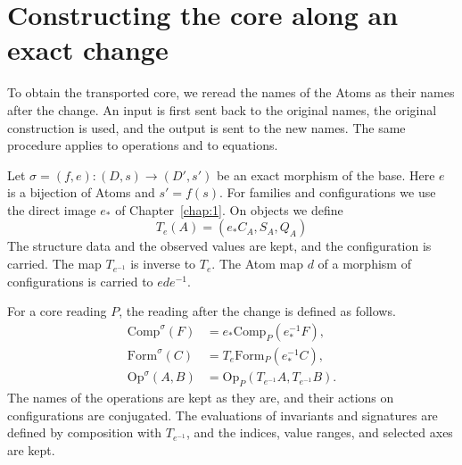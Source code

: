 \section{Constructing the core along an exact change}\label{sec:4.2}

To obtain the transported core, we reread the names of the Atoms as their names after the
change. An input is first sent back to the original names, the original construction is
used, and the output is sent to the new names. The same procedure applies to operations and
to equations.

\begin{construction}\label{cons:4.3}

Let $\sigma=(f,e):(D,s)\to(D',s')$ be an exact morphism of the base. Here $e$ is a
bijection of Atoms and $s'=f(s)$. For families and configurations we use the direct image
$e_*$ of Chapter~\ref{chap:1}. On objects we define
\begin{equation*}
T_e(A)=(e_*C_A,S_A,Q_A)
\tag{4.4}\label{eq:4.4}
\end{equation*}
The structure data and the observed values are kept, and the configuration is carried. The
map $T_{e^{-1}}$ is inverse to $T_e$.
The Atom map $d$ of a morphism of configurations is carried to $ede^{-1}$.

For a core reading $P$, the reading after the change is defined as follows.
\begin{equation*}
\begin{aligned}
\mathrm{Comp}^{\sigma}(F)
 &=e_*\mathrm{Comp}_P(e_*^{-1}F),\\
\mathrm{Form}^{\sigma}(C)
 &=T_e\mathrm{Form}_P(e_*^{-1}C),\\
\mathrm{Op}^{\sigma}(A,B)
 &=\mathrm{Op}_P(T_{e^{-1}}A,T_{e^{-1}}B).
\end{aligned}
\tag{4.5}\label{eq:4.5}
\end{equation*}
The names of the operations are kept as they are, and their actions on configurations are
conjugated. The evaluations of invariants and signatures are defined by composition with
$T_{e^{-1}}$, and the indices, value ranges, and selected axes are kept.


\end{construction}
